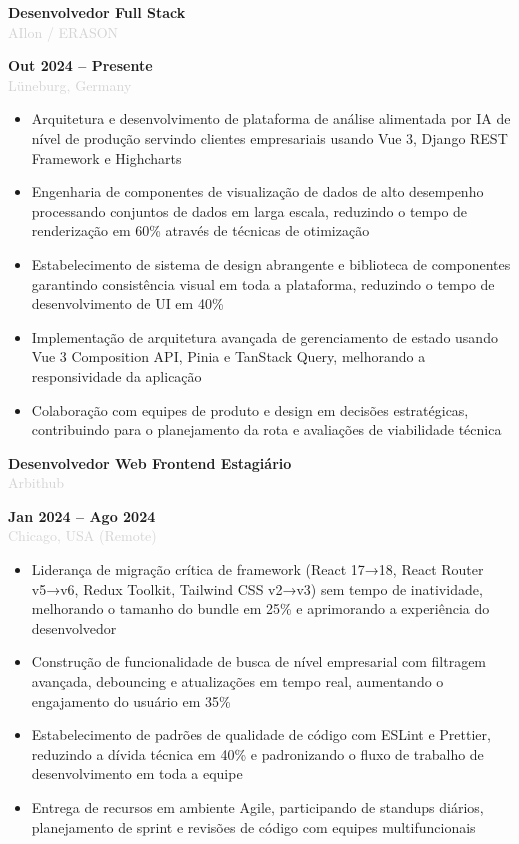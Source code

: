 \documentclass[10pt,a4paper]{article}
\newcommand{\Experience}[4]{%
  \vspace{2pt}
  \noindent
  \begin{minipage}[t]{0.70\textwidth}
    {\normalsize\textbf{\color{darkgray}#3}} \\
    \textcolor{lightgray}{\small #1}
  \end{minipage}%
  \hfill
  \begin{minipage}[t]{0.28\textwidth}
    \raggedleft
    \textcolor{mediumgray}{\small\textbf{#4}} \\
    \textcolor{lightgray}{\small #2}
  \end{minipage}
  \vspace{1pt}
}
\begin{document}
\Experience{AIlon / ERASON}{Lüneburg, Germany}{Desenvolvedor Full Stack}{Out 2024 -- Presente}
\begin{itemize}
  \item Arquitetura e desenvolvimento de plataforma de análise alimentada por IA de nível de produção servindo clientes empresariais usando Vue 3, Django REST Framework e Highcharts
  \item Engenharia de componentes de visualização de dados de alto desempenho processando conjuntos de dados em larga escala, reduzindo o tempo de renderização em 60\% através de técnicas de otimização
  \item Estabelecimento de sistema de design abrangente e biblioteca de componentes garantindo consistência visual em toda a plataforma, reduzindo o tempo de desenvolvimento de UI em 40\%
  \item Implementação de arquitetura avançada de gerenciamento de estado usando Vue 3 Composition API, Pinia e TanStack Query, melhorando a responsividade da aplicação
  \item Colaboração com equipes de produto e design em decisões estratégicas, contribuindo para o planejamento da rota e avaliações de viabilidade técnica
\end{itemize}

\Experience{Arbithub}{Chicago, USA (Remote)}{Desenvolvedor Web Frontend Estagiário}{Jan 2024 -- Ago 2024}
\begin{itemize}
  \item Liderança de migração crítica de framework (React 17→18, React Router v5→v6, Redux Toolkit, Tailwind CSS v2→v3) sem tempo de inatividade, melhorando o tamanho do bundle em 25\% e aprimorando a experiência do desenvolvedor
  \item Construção de funcionalidade de busca de nível empresarial com filtragem avançada, debouncing e atualizações em tempo real, aumentando o engajamento do usuário em 35\%
  \item Estabelecimento de padrões de qualidade de código com ESLint e Prettier, reduzindo a dívida técnica em 40\% e padronizando o fluxo de trabalho de desenvolvimento em toda a equipe
  \item Entrega de recursos em ambiente Agile, participando de standups diários, planejamento de sprint e revisões de código com equipes multifuncionais
\end{itemize}
\end{document}
